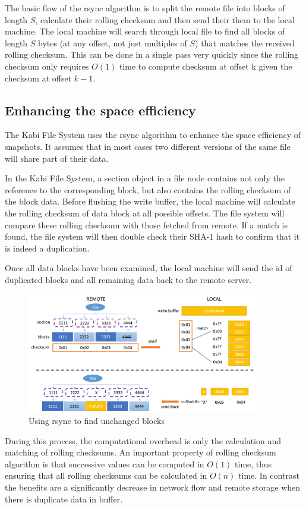     The basic flow of the rsync algorithm is to split the remote file into blocks of length $S$, calculate their rolling checksum and then send their them to the local machine. The local machine will search through local file to find all blocks of length $S$ bytes (at any offset, not just multiples of $S$) that matches the received rolling checksum. This can be done in a single pass very quickly since the rolling checksum only requires $O(1)$ time to compute checksum at offset k given the checksum at offset $k-1$.

\subsection{Enhancing the space efficiency}

    The Kabi File System uses the rsync algorithm to enhance the space efficiency of snapshots. It assumes that in most cases two different versions of the same file will share part of their data.

    In the Kabi File System, a section object in a file node contains not only the reference to the corresponding block, but also contains the rolling checksum of the block data. Before flushing the write buffer, the local machine will calculate the rolling checksum of data block at all possible offsets. The file system will compare these rolling checksum with those fetched from remote. If a match is found, the file system will then double check their SHA-1 hash to confirm that it is indeed a duplication.
    
    Once all data blocks have been examined, the local machine will send the id of duplicated blocks and all remaining data back to the remote server.


\begin{figure}[hbtp]
\centering
\includegraphics[width=0.9\textwidth]{Chapter-4/figs/fig25.png}
\caption{Using rsync to find unchanged blocks}
\label{fig:rsync}
\end{figure}

    During this process, the computational overhead is only the calculation and matching of rolling checksums. An important property of rolling checksum algorithm is that successive values can be computed in $O(1)$ time, thus ensuring that all rolling checksums can be calculated in $O(n)$ time. In contrast the benefits are a significantly decrease in network flow and remote storage when there is duplicate data in buffer.
